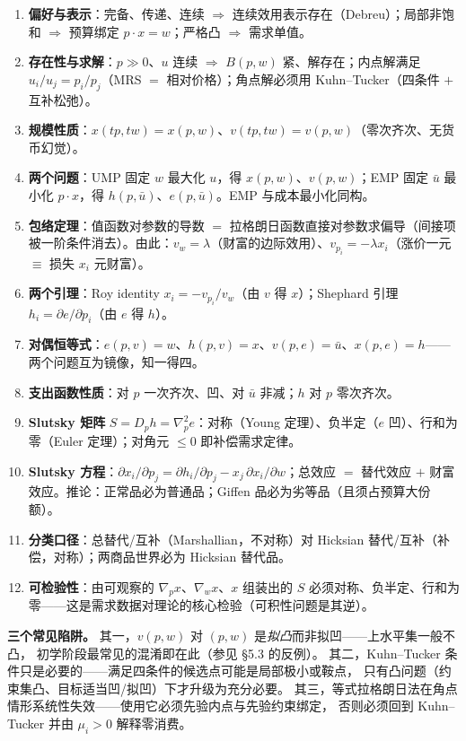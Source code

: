 \begin{enumerate}
\item \textbf{偏好与表示}：完备、传递、连续 $\Rightarrow$ 连续效用表示存在（Debreu）；局部非饱和 $\Rightarrow$ 预算绑定 $p\cdot x=w$；严格凸 $\Rightarrow$ 需求单值。
\item \textbf{存在性与求解}：$p\gg0$、$u$ 连续 $\Rightarrow$ $B(p,w)$ 紧、解存在；内点解满足 $u_i/u_j=p_i/p_j$（MRS $=$ 相对价格）；角点解必须用 Kuhn--Tucker（四条件 $+$ 互补松弛）。
\item \textbf{规模性质}：$x(tp,tw)=x(p,w)$、$v(tp,tw)=v(p,w)$（零次齐次、无货币幻觉）。
\item \textbf{两个问题}：UMP 固定 $w$ 最大化 $u$，得 $x(p,w)$、$v(p,w)$；EMP 固定 $\bar u$ 最小化 $p\cdot x$，得 $h(p,\bar u)$、$e(p,\bar u)$。EMP 与成本最小化同构。
\item \textbf{包络定理}：值函数对参数的导数 $=$ 拉格朗日函数直接对参数求偏导（间接项被一阶条件消去）。由此：$v_w=\lambda$（财富的边际效用）、$v_{p_i}=-\lambda x_i$（涨价一元 $\equiv$ 损失 $x_i$ 元财富）。
\item \textbf{两个引理}：Roy identity $x_i=-v_{p_i}/v_w$（由 $v$ 得 $x$）；Shephard 引理 $h_i=\partial e/\partial p_i$（由 $e$ 得 $h$）。
\item \textbf{对偶恒等式}：$e(p,v)=w$、$h(p,v)=x$、$v(p,e)=\bar u$、$x(p,e)=h$——两个问题互为镜像，知一得四。
\item \textbf{支出函数性质}：对 $p$ 一次齐次、凹、对 $\bar u$ 非减；$h$ 对 $p$ 零次齐次。
\item \textbf{Slutsky 矩阵} $S=D_ph=\nabla^2_pe$：对称（Young 定理）、负半定（$e$ 凹）、行和为零（Euler 定理）；对角元 $\le0$ 即补偿需求定律。
\item \textbf{Slutsky 方程}：$\partial x_i/\partial p_j=\partial h_i/\partial p_j-x_j\,\partial x_i/\partial w$；总效应 $=$ 替代效应 $+$ 财富效应。推论：正常品必为普通品；Giffen 品必为劣等品（且须占预算大份额）。
\item \textbf{分类口径}：总替代/互补（Marshallian，不对称）对 Hicksian 替代/互补（补偿，对称）；两商品世界必为 Hicksian 替代品。
\item \textbf{可检验性}：由可观察的 $\nabla_px$、$\nabla_wx$、$x$ 组装出的 $S$ 必须对称、负半定、行和为零——这是需求数据对理论的核心检验（可积性问题是其逆）。
\end{enumerate}

\medskip
\noindent\textbf{三个常见陷阱。}
其一，$v(p,w)$ 对 $(p,w)$ 是\emph{拟凸}而非拟凹——上水平集一般不凸，
初学阶段最常见的混淆即在此（参见 \S 5.3 的反例）。
其二，Kuhn--Tucker 条件只是必要的——满足四条件的候选点可能是局部极小或鞍点，
只有凸问题（约束集凸、目标适当凹/拟凹）下才升级为充分必要。
其三，等式拉格朗日法在角点情形系统性失效——使用它必须先验内点与先验约束绑定，
否则必须回到 Kuhn--Tucker 并由 $\mu_i>0$ 解释零消费。
